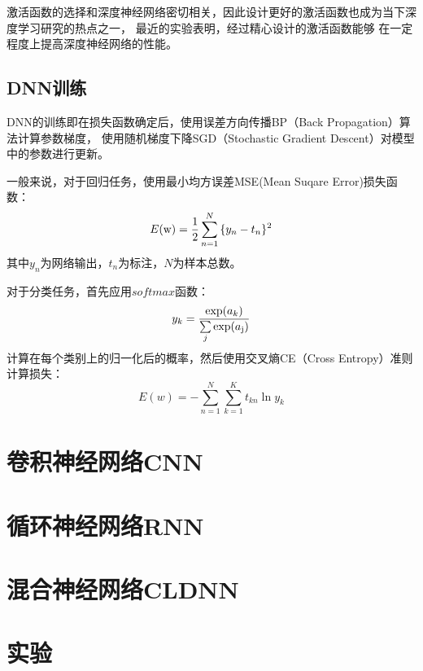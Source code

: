 激活函数的选择和深度神经网络密切相关，因此设计更好的激活函数也成为当下深度学习研究的热点之一，
最近的实验表明，经过精心设计的激活函数能够
在一定程度上提高深度神经网络的性能。

\subsection{DNN训练}

DNN的训练即在损失函数确定后，使用误差方向传播BP（Back Propagation）算法计算参数梯度，
使用随机梯度下降SGD（Stochastic Gradient Descent）对模型中的参数进行更新。

一般来说，对于回归任务，使用最小均方误差MSE(Mean Suqare Error)损失函数：
\begin{equation}
E({\rm{w}}) = \frac{1}{2}\sum\limits_{n = 1}^N {\{ {y_n}}  - {t_n}{\} ^2}
\end{equation}
其中$y_n$为网络输出，$t_n$为标注，$N$为样本总数。

对于分类任务，首先应用$softmax$函数：
\begin{equation}
{y_k} = \frac{{\exp ({a_k})}}{{\sum\limits_j {\exp ({a_{\rm{j}}})} }}
\end{equation}
计算在每个类别上的归一化后的概率，然后使用交叉熵CE（Cross Entropy）准则计算损失：
\begin{equation}
E(w) =  - \sum\limits_{n = 1}^N {\sum\limits_{k = 1}^K {{t_{kn}}\ln {y_k}} }
\end{equation}

\section{卷积神经网络CNN}

\section{循环神经网络RNN}

\section{混合神经网络CLDNN}

\section{实验} 